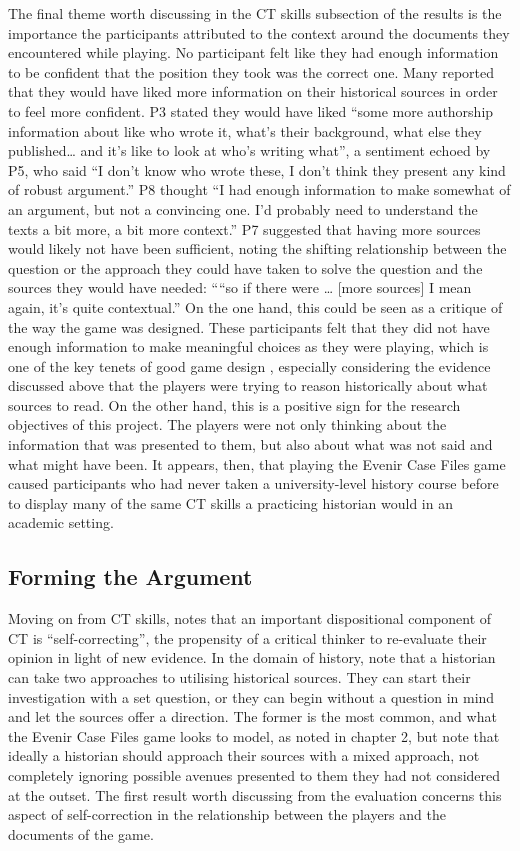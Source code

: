\documentclass{l4proj}
\begin{document}
The final theme worth discussing in the CT skills subsection of the results is the importance the participants attributed to the context around the documents they encountered while playing. No participant felt like they had enough information to be confident that the position they took was the correct one. Many reported that they would have liked more information on their historical sources in order to feel more confident. P3 stated they would have liked “some more authorship information about like who wrote it, what’s their background, what else they published… and it’s like to look at who’s writing what”, a sentiment echoed by P5, who said “I don’t know who wrote these, I don’t think they present any kind of robust argument.” P8 thought “I had enough information to make somewhat of an argument, but not a convincing one. I’d probably need to understand the texts a bit more, a bit more context.” P7 suggested that having more sources would likely not have been sufficient, noting the shifting relationship between the question or the approach they could have taken to solve the question and the sources they would have needed: ““so if there were … [more sources] I mean again, it’s quite contextual.”  On the one hand, this could be seen as a critique of the way the game was designed. These participants felt that they did not have enough information to make meaningful choices as they were playing, which is one of the key tenets of good game design \citep{salen2004rules}, especially considering the evidence discussed above that the players were trying to reason historically about what sources to read. On the other hand, this is a positive sign for the research objectives of this project. The players were not only thinking about the information that was presented to them, but also about what was not said and what might have been. It appears, then, that playing the Evenir Case Files game caused participants who had never taken a university-level history course before to display many of the same CT skills a practicing historian would in an academic setting. 

\subsection{Forming the Argument}

Moving on from CT skills, \citet{facione2000CT} notes that an important dispositional component of CT is “self-correcting”, the propensity of a critical thinker to re-evaluate their opinion in light of new evidence. In the domain of history, \citet{tosh2006pursuit} note that a historian can take two approaches to utilising historical sources. They can start their investigation with a set question, or they can begin without a question in mind and let the sources offer a direction. The former is the most common, and what the Evenir Case Files game looks to model, as noted in chapter 2, but \citet{tosh2006pursuit} note that ideally a historian should approach their sources with a mixed approach, not completely ignoring possible avenues presented to them they had not considered at the outset. The first result worth discussing from the evaluation concerns this aspect of self-correction in the relationship between the players and the documents of the game. 
\end{document}
